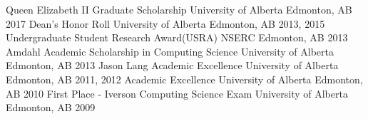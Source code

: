 \begin{cvhonors}
    \cvhonor
    {Queen Elizabeth II Graduate Scholarship}
    {University of Alberta}
    {Edmonton, AB}
    {2017}
    \cvhonor
    {Dean's Honor Roll}
    {University of Alberta}
    {Edmonton, AB}
    {2013, 2015}
    \cvhonor
    {Undergraduate Student Research Award(USRA)}
    {NSERC}
    {Edmonton, AB}
    {2013}
    \cvhonor
    {Amdahl Academic Scholarship in Computing Science}
    {University of Alberta}
    {Edmonton, AB}
    {2013}
    \cvhonor
    {Jason Lang Academic Excellence}
    {University of Alberta}
    {Edmonton, AB}
    {2011, 2012}
    \cvhonor
    {Academic Excellence}
    {University of Alberta}
    {Edmonton, AB}
    {2010}
    \cvhonor
    {First Place - Iverson Computing Science Exam}
    {University of Alberta}
    {Edmonton, AB}
    {2009}
\end{cvhonors}

